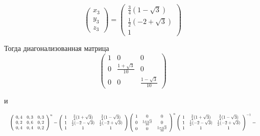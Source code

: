 \documentclass[a4paper,12pt]{article} %
\begin{document}
\begin{example}
$$
\left(\begin{array}{l}
x_{3} \\
y_{3} \\
z_{3}
\end{array}\right)=\left(\begin{array}{c}
\frac{3}{4}(1-\sqrt{3}) \\
\frac{1}{2}(-2+\sqrt{3}) \\
1
\end{array}\right)
$$



Тогда диагонализованная матрица $$\left(\begin{array}{ccc}1 & 0 & 0 \\ 0 & \frac{1+\sqrt{3}}{10} & 0 \\ 0 & 0 & \frac{1-\sqrt{3}}{10}\end{array}\right)$$

и

$$
  \resizebox{\hsize}{!}{%
	$
	\left(\begin{array}{ccc}0,4 & 0,3 & 0,3 \\ 0,2 & 0,6 & 0,2 \\ 0,4 & 0,4 & 0,2\end{array}\right)^{n}
=
\left(\begin{array}{ccc}
	1 & \frac{3}{4}(1+\sqrt{3}) & \frac{3}{4}(1-\sqrt{3}) \\ 
	1 & \frac{1}{2}(-2-\sqrt{3}) & \frac{1}{2}(-2+\sqrt{3}) \\ 
	1 & 1 & 1
\end{array}\right)
\left(\begin{array}{ccc}
	1 & 0 & 0 \\ 
	0 & \frac{1+\sqrt{3}}{10} & 0 \\ 
	0 & 0 & 
	\frac{1-\sqrt{3}}{10}
\end{array}\right)^{n}
\left(\begin{array}{ccc}
1 & \frac{3}{4}(1+\sqrt{3}) & \frac{3}{4}(1-\sqrt{3}) \\ 
1 & \frac{1}{2}(-2-\sqrt{3}) & \frac{1}{2}(-2+\sqrt{3}) \\ 
1 & 1 & 1
\end{array}\right)^{-1}=
$}
$$




\end{example}
\end{document}
